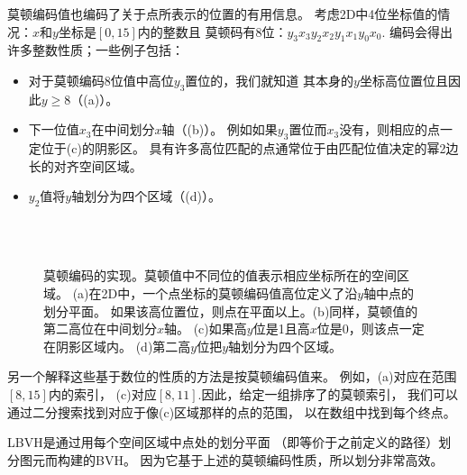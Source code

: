 莫顿编码值也编码了关于点所表示的位置的有用信息。
考虑2D中4位坐标值的情况：$x$和$y$坐标是$[0,15]$内的整数且
莫顿码有8位：$y_3x_3y_2x_2y_1x_1y_0x_0$.
编码会得出许多整数性质；一些例子包括：
\begin{itemize}
    \item 对于莫顿编码8位值中高位$y_3$置位的，我们就知道
          其本身的$y$坐标高位置位且因此$y\ge8$（(a)）。
    \item 下一位值$x_3$在中间划分$x$轴（(b)）。
          例如如果$y_3$置位而$x_3$没有，则相应的点一定位于(c)的阴影区。
          具有许多高位匹配的点通常位于由匹配位值决定的幂2边长的对齐空间区域。
    \item $y_2$值将$y$轴划分为四个区域（(d)）。
\end{itemize}
\begin{figure}[htb]
    \centering\\
    
    
    \\
    
    \caption{莫顿编码的实现。莫顿值中不同位的值表示相应坐标所在的空间区域。
        (a)在2D中，一个点坐标的莫顿编码值高位定义了沿$y$轴中点的划分平面。
        如果该高位置位，则点在平面以上。(b)同样，莫顿值的第二高位在中间划分$x$轴。
        (c)如果高$y$位是1且高$x$位是0，则该点一定在阴影区域内。
        (d)第二高$y$位把$y$轴划分为四个区域。}
    \label{fig:4.8}
\end{figure}

另一个解释这些基于数位的性质的方法是按莫顿编码值来。
例如，(a)对应在范围$[8,15]$内的索引，
(c)对应$[8,11]$.因此，给定一组排序了的莫顿索引，
我们可以通过二分搜索找到对应于像(c)区域那样的点的范围，
以在数组中找到每个终点。

LBVH是通过用每个空间区域中点处的划分平面
（即等价于之前定义的路径）划分图元而构建的BVH。
因为它基于上述的莫顿编码性质，所以划分非常高效。

